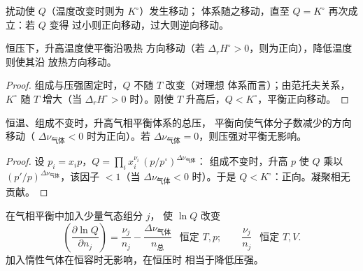 \begin{omfigure}

{\small 扰动使 $Q$（温度改变时则为 $K^\circ$）发生移动；
体系随之移动，直至 $Q = K^\circ$ 再次成立：若 $Q$ 变得
过小则正向移动，过大则逆向移动。}
\end{omfigure}

\begin{proposition}[温度]\label{prop:b2:equilibrium-shifts:temperature}
恒压下，升高温度使平衡沿吸热
方向移动（若 $\Delta_r H^\circ > 0$，则为正向），降低温度则使其沿
放热方向移动。
\end{proposition}

\begin{proof}
组成与压强固定时，$Q$ 不随 $T$ 改变（对理想
体系而言）；由范托夫关系，$K^\circ$ 随 $T$ 增大（当 $\Delta_r H^\circ >
0$ 时）。刚使 $T$ 升高后，$Q < K^\circ$，平衡正向移动。
\end{proof}

\begin{proposition}[压强]\label{prop:b2:equilibrium-shifts:pressure}
恒温、组成不变时，升高气相平衡体系的总压，
平衡向使气体分子数减少的方向移动（
$\Delta\nu_{\text{气体}} < 0$ 时为正向）。若 $\Delta\nu_{\text{气体}}
= 0$，则压强对平衡无影响。
\end{proposition}

\begin{proof}
设 $p_i = x_ip$，$Q = \prod_i x_i^{\nu_i}\,(p/p^\circ)^{\Delta\nu_{\text{气体}}}$：
组成不变时，升高 $p$ 使 $Q$ 乘以
$(p'/p)^{\Delta\nu_{\text{气体}}}$，该因子 $< 1$（当 $\Delta\nu_{\text{气体}} <
0$ 时）。于是 $Q < K^\circ$：正向。凝聚相无贡献。
\end{proof}

\begin{proposition}[加入组分或惰性气体]\label{prop:b2:equilibrium-shifts:adding}
在气相平衡中加入少量气态组分 $j$，
使 $\ln Q$ 改变
\[
  \left(\frac{\partial\ln Q}{\partial n_j}\right) = \frac{\nu_j}{n_j} -
  \frac{\Delta\nu_{\text{气体}}}{n_{\text{总}}}\ \ \text{ 恒定 } T, p ;
  \qquad \frac{\nu_j}{n_j}\ \ \text{ 恒定 } T, V .
\]
加入惰性气体在恒容时无影响，在恒压时
相当于降低压强。
\end{proposition}


